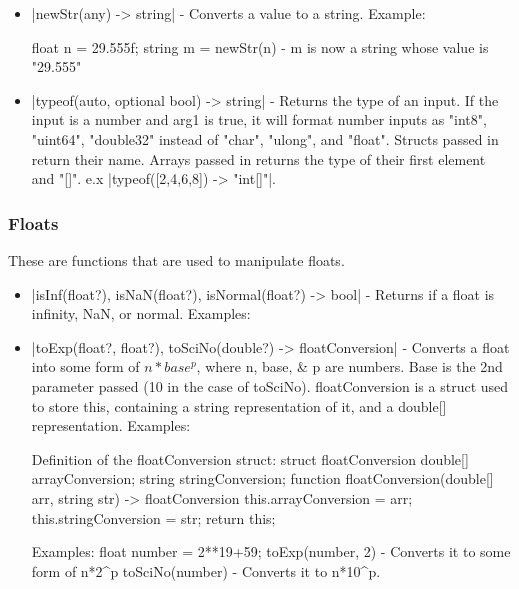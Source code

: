 \documentclass[12pt, letterpaper, oneside]{article}
\begin{document}
\begin{itemize}
		
		\begin{spverbatim}
			float n = 29f;
			double m = scaleDec(n, 64); - m is now a double with the value of 29.
		\end{spverbatim}
		\item[--] \spverb|newStr(any) -> string| - Converts a value to a string. Example:
		
		
		\begin{spverbatim}
			float n = 29.555f;
			string m = newStr(n) - m is now a string whose value is "29.555"
		\end{spverbatim}
		\label{misc:typeof}
		\item[--] \spverb|typeof(auto, optional bool) -> string| - Returns the type of an input. If the input is a number and arg1 is true, it will format number inputs as "int8", "uint64", "double32" instead of "char", "ulong", and "float". Structs passed in return their name. Arrays passed in returns the type of their first element and "[]". e.x \spverb|typeof([2,4,6,8]) -> "int[]"|.
	\end{itemize}
	\newpage
	\subsubsection{Floats}
	These are functions that are used to manipulate floats.
	\begin{itemize}
		\item[--] \spverb|isInf(float?), isNaN(float?), isNormal(float?) -> bool| - Returns if a float is infinity, NaN, or normal. Examples:
		\item[--] \spverb|toExp(float?, float?), toSciNo(double?) -> floatConversion| - Converts a float into some form of $n*base^{p}$, where n, base, \& p are numbers. Base is the 2nd parameter passed (10 in the case of toSciNo). floatConversion is a struct used to store this, containing a string representation of it, and a double[] representation. Examples:
		\begin{spverbatim}
			Definition of the floatConversion struct:
			struct floatConversion {
				double[] arrayConversion;
				string stringConversion;
				function floatConversion(double[] arr, string str) -> floatConversion {
					this.arrayConversion = arr;
					this.stringConversion = str;
					return this;
				}
			}
		\end{spverbatim}
		\begin{spverbatim}
			Examples:
			float number = 2**19+59;
			toExp(number, 2) - Converts it to some form of n*2^p
			toSciNo(number) - Converts it to n*10^p.
		\end{spverbatim}
	\end{itemize}
	\newpage
\end{document}
